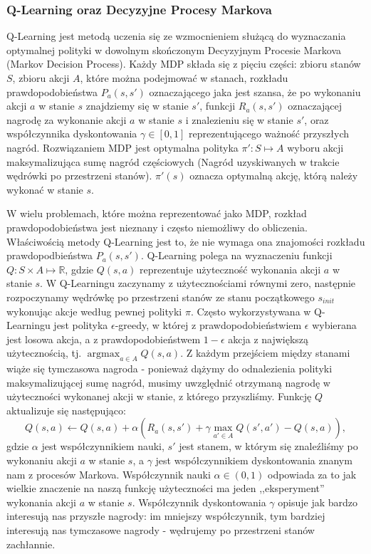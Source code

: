 \documentclass{article}
\DeclareMathOperator{\argmax}{argmax}
\begin{document}
\subsubsection{Q-Learning oraz Decyzyjne Procesy Markova}
Q-Learning jest metodą uczenia się ze wzmocnieniem służącą do wyznaczania optymalnej polityki w dowolnym skończonym Decyzyjnym Procesie Markova (Markov Decision Process). Każdy MDP składa się z pięciu części: zbioru stanów $S$, zbioru akcji $A$, które można podejmować w stanach, rozkładu prawdopodobieństwa $P_a(s, s')$ oznaczającego jaka jest szansa, że po wykonaniu akcji $a$ w stanie $s$ znajdziemy się w stanie $s'$, funkcji $R_a(s,s')$ oznaczającej nagrodę za wykonanie akcji $a$ w stanie $s$ i znalezieniu się w stanie $s'$, oraz współczynnika dyskontowania $\gamma \in [0,1]$ reprezentującego ważność przyszłych nagród. Rozwiązaniem MDP jest optymalna polityka $\pi' : S \mapsto A$ wyboru akcji maksymalizująca sumę nagród częściowych (Nagród uzyskiwanych w trakcie wędrówki po przestrzeni stanów). $\pi'(s)$ oznacza optymalną akcję, którą należy wykonać w stanie $s$.

W wielu problemach, które można reprezentować jako MDP, rozkład prawdopodobieństwa jest nieznany i często niemożliwy do obliczenia. Właściwością metody Q-Learning jest to, że nie wymaga ona znajomości rozkładu prawdopodbieństwa $P_a(s,s')$. Q-Learning polega na wyznaczeniu funkcji $Q : S \times A \mapsto \mathbb{R}$, gdzie $Q(s,a)$ reprezentuje użyteczność wykonania akcji $a$ w stanie $s$. W Q-Learningu zaczynamy z użytecznościami równymi zero, następnie rozpoczynamy wędrówkę po przestrzeni stanów ze stanu początkowego $s_{init}$ wykonując akcje według pewnej polityki $\pi$. Często wykorzystywana w Q-Learningu jest polityka $\epsilon$-greedy, w której z prawdopodobieństwiem $\epsilon$ wybierana jest losowa akcja, a z prawdopodobieństwem $1 - \epsilon$ akcja z największą użytecznością, tj. $\argmax_{a \in A} Q(s, a)$. Z każdym przejściem między stanami wiąże się tymczasowa nagroda - ponieważ dążymy do odnalezienia polityki maksymalizującej sumę nagród, musimy uwzględnić otrzymaną nagrodę w użyteczności wykonanej akcji w stanie, z którego przyszliśmy. Funkcję $Q$ aktualizuje się następująco:
\begin{equation}
Q(s,a) \leftarrow Q(s,a) + \alpha(R_a(s,s') + \gamma \max_{a' \in A} Q(s',a') - Q(s,a)) ,
\end{equation}
gdzie $\alpha$ jest współczynnikiem nauki, $s'$ jest stanem, w którym się znaleźliśmy po wykonaniu akcji $a$ w stanie $s$, a $\gamma$ jest współczynnikiem dyskontowania znanym nam z procesów Markova. Współczynnik nauki $\alpha \in (0,1)$ odpowiada za to jak wielkie znaczenie na naszą funkcję użyteczności ma jeden ,,eksperyment'' wykonania akcji $a$ w stanie $s$. Współczynnik dyskontowania $\gamma$ opisuje jak bardzo interesują nas przyszłe nagrody: im mniejszy współczynnik, tym bardziej interesują nas tymczasowe nagrody - wędrujemy po przestrzeni stanów zachłannie.
\end{document}
